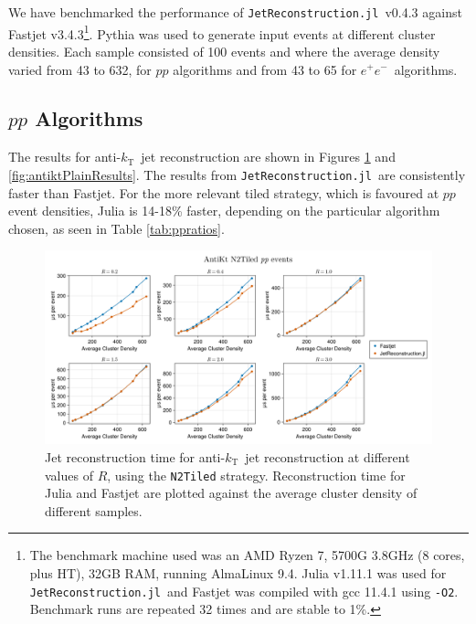\documentclass{webofc}
\newcommand{\akt}{anti-${k}_\text{T}$}
\newcommand{\JR}{\texttt{JetReconstruction.jl}}
\newcommand{\ee}{$e^+e^-$}
\begin{document}
We have benchmarked the performance of \JR\ v0.4.3 against Fastjet
v3.4.3\footnote{The benchmark machine used was an AMD Ryzen 7, 5700G 3.8GHz (8
cores, plus HT), 32GB RAM, running AlmaLinux 9.4. Julia v1.11.1 was used for
\JR\ and Fastjet was compiled with gcc 11.4.1 using \texttt{-O2}. Benchmark runs
are repeated 32 times and are stable to 1\%.}. Pythia was used to generate input
events at different cluster densities. Each sample consisted of 100 events and
where the average density varied from 43 to 632, for $pp$ algorithms and from 43 to
65 for \ee\ algorithms.

\subsection{$pp$ Algorithms}

The results for \akt\ jet reconstruction are shown in Figures
\ref{fig:antiktTiledResults} and \ref{fig:antiktPlainResults}. The results from
\JR\ are consistently faster than Fastjet. For the more relevant tiled strategy,
which is favoured at $pp$ event densities, Julia is 14-18\% faster, depending on
the particular algorithm chosen, as seen in Table \ref{tab:ppratios}.

\begin{figure}[th]
    \begin{center}
        \includegraphics[width=0.8\linewidth]{Alma9-AMD-Ryzen7-Julia-Fastjet-AntiKt-N2Tiled-MultiR.png}
        \caption{Jet reconstruction time for \akt\ jet reconstruction at different values of $R$, using the \texttt{N2Tiled} strategy. Reconstruction time for Julia and Fastjet are plotted against the average cluster density of different samples.}
        \label{fig:antiktTiledResults}
    \end{center}
\end{figure}
\end{document}
